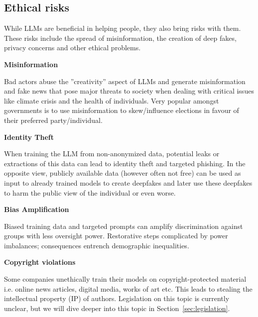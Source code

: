 \subsection{Ethical risks}
While LLMs are beneficial in helping people, they also bring risks with them. These risks include the spread of misinformation, the creation of deep fakes, privacy concerns and other ethical problems. 


\textbf{Misinformation}

Bad actors abuse the ''creativity'' aspect of LLMs and generate misinformation and fake news that pose major threats to society when dealing with critical issues like climate crisis and the health of individuals. Very popular amongst governments is to use misinformation to skew/influence elections in favour of their preferred party/individual.

\textbf{Identity Theft}

When training the LLM from non-anonymized data, potential leaks or extractions of this data can lead to identity theft and targeted phishing.
In the opposite view, publicly available data (however often not free) can be used as input to already trained models to create deepfakes and later use these deepfakes to harm the public view of the individual or even worse.

\textbf{Bias Amplification}

Biased training data and targeted prompts can amplify discrimination against groups with less oversight power. 
Restorative steps complicated by power imbalances; consequences entrench demographic inequalities\cite{kumar2024ethicsinteractionmitigatingsecurity}. 


\textbf{Copyright violations}

Some companies unethically train their models on copyright-protected material i.e. online news articles, digital media, works of art etc. This leads to stealing the intellectual property (IP) of authors. Legislation on this topic is currently unclear, but we will dive deeper into this topic in Section~\ref{sec:legislation}.

